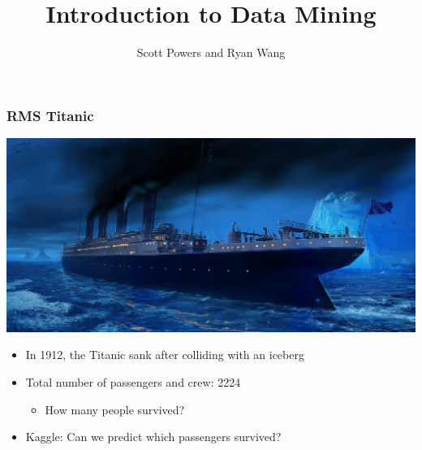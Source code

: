 \documentclass{beamer}
\title{Introduction to Data Mining}
\author{Scott Powers and Ryan Wang}
\begin{document}
\begin{frame}
\titlepage
\end{frame}

\begin{frame}
\frametitle{RMS Titanic}
\begin{center}
\includegraphics[scale = .15]{titanic.jpg}
\end{center}
\begin{itemize}
\item In 1912, the Titanic sank after colliding with an iceberg
\item Total number of passengers and crew: 2224
\begin{itemize}
\item How many people survived? 
\end{itemize}
\item Kaggle: Can we predict which passengers survived?
\end{itemize}
\end{frame}
\end{document}
